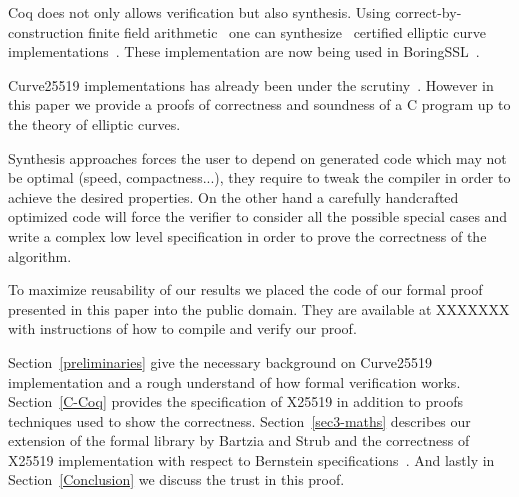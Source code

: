 Coq does not only allows verification but also synthesis.
Using correct-by-construction finite field arithmetic~\cite{Philipoom2018CorrectbyconstructionFF}
one can synthesize~\cite{Erbsen2016SystematicSO} certified elliptic curve
implementations~\cite{Erbsen2017CraftingCE}. These implementation are now being used in BoringSSL~\cite{fiat-crypto}.

Curve25519 implementations has already been under the scrutiny~\cite{Chen2014VerifyingCS}.
However in this paper we provide a proofs of correctness and soundness of a C program up to
the theory of elliptic curves.

Synthesis approaches forces the user to depend on generated code which may not
be optimal (speed, compactness...), they require to tweak the compiler in order
to achieve the desired properties. On the other hand a carefully handcrafted
optimized code will force the verifier to consider all the possible special cases
and write a complex low level specification in order to prove the correctness of
the algorithm.

To maximize reusability of our results we placed the code of our formal proof
presented in this paper into the public domain. They are available at XXXXXXX
with instructions of how to compile and verify our proof.

Section~\ref{preliminaries} give the necessary background on Curve25519
implementation and a rough understand of how formal verification works.
Section~\ref{C-Coq} provides the specification of X25519 in addition to proofs
techniques used to show the correctness.
Section~\ref{sec3-maths} describes our extension of the formal library by Bartzia
and Strub and the correctness of X25519 implementation with respect to Bernstein
specifications~\cite{Ber14}.
And lastly in Section~\ref{Conclusion} we discuss the trust in this proof.



%
%
